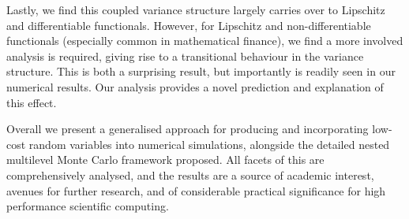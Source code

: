 \documentclass[twocolumn,10pt]{extarticle}
\begin{document}
Lastly, we find this coupled variance structure largely carries over to Lipschitz and differentiable functionals. However, for Lipschitz and non-differentiable functionals (especially common in mathematical finance), we find a more involved analysis is required, giving rise to a transitional behaviour in the variance structure. This is both a surprising result, but importantly is readily seen in our numerical results. Our analysis provides a novel prediction and explanation of this effect. 

Overall we present a generalised approach for producing and incorporating low-cost random variables into numerical simulations, alongside the detailed nested multilevel Monte Carlo framework proposed. All facets of this are comprehensively analysed, and the results are a source of academic interest, avenues for further research, and of considerable practical significance for high performance scientific computing. 


\end{document}
